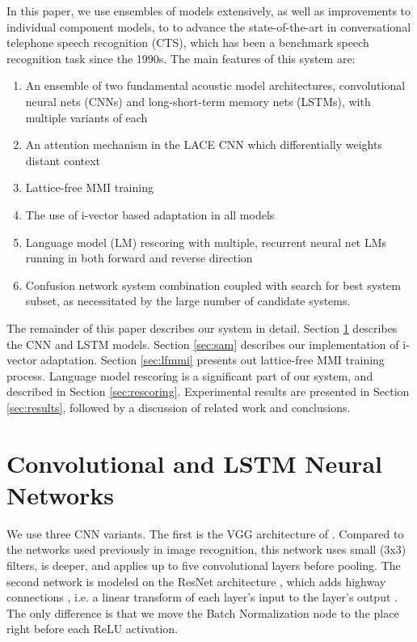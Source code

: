 \documentclass{article}
\begin{document}
In this paper, we use ensembles of models extensively, as well as improvements to individual component models, to
to advance the state-of-the-art in conversational telephone speech recognition (CTS), which has been a benchmark speech recognition task since the 1990s.
The main features of this system are:
\begin{enumerate}
\item
An ensemble of two fundamental acoustic model architectures, convolutional neural nets (CNNs) and long-short-term memory nets (LSTMs), with multiple variants of each 
\item
An attention mechanism in the LACE CNN which differentially weights distant context \cite{yu2016deep}
\item
Lattice-free MMI training \cite{chen2006advances,povey2016purely}
\item
The use of i-vector based adaptation \cite{saon2013speaker} in all models 
\item
Language model (LM) rescoring with multiple, recurrent neural net LMs \cite{mikolov2010recurrent}
running in both forward and reverse direction
\item
Confusion network system combination \cite{sri-2000} coupled with search for best system subset, as necessitated by the large number of candidate systems.
\end{enumerate}

The remainder of this paper describes our system in detail.
Section \ref{sec:cnn+lstm} describes the CNN and LSTM models.
Section \ref{sec:sam} describes our implementation of i-vector adaptation. Section \ref{sec:lfmmi}
presents out lattice-free MMI training process.
Language model rescoring is a significant part of our system, and described in Section \ref{sec:rescoring}.
Experimental results are presented in Section \ref{sec:results}, followed
by a discussion of related work and conclusions.


\section{Convolutional and LSTM Neural Networks}
\label{sec:cnn+lstm}

We use three CNN variants. The first is the VGG architecture of \cite{Simonyan2014very}. Compared to the networks used previously in image recognition, this 
network uses small (3x3) filters, is deeper, and applies up to 
five convolutional layers before pooling. 
The second network is modeled on the ResNet architecture \cite{he2015deep}, 
which adds highway connections \cite{DBLP:journals/corr/SrivastavaGS15}, i.e. a linear transform of each layer's input to the layer's output
\cite{DBLP:journals/corr/SrivastavaGS15,ghahremani2016linearly}. The only difference is that we move the Batch Normalization node to the place right before each ReLU activation.
\end{document}
